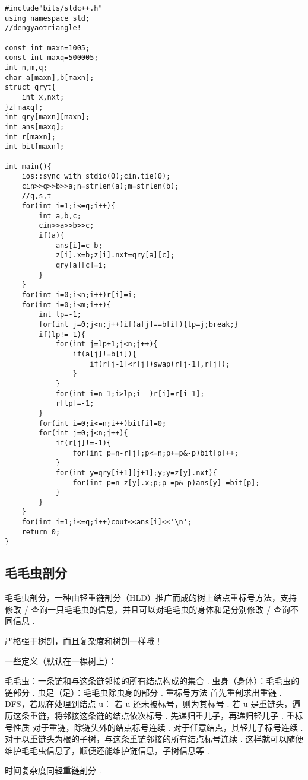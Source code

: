 \documentclass[12pt]{ctexart}
\begin{document}
\begin{lstlisting}
#include"bits/stdc++.h"
using namespace std;
//dengyaotriangle!

const int maxn=1005;
const int maxq=500005;
int n,m,q;
char a[maxn],b[maxn];
struct qryt{
    int x,nxt;
}z[maxq];
int qry[maxn][maxn];
int ans[maxq];
int r[maxn];
int bit[maxn];

int main(){
    ios::sync_with_stdio(0);cin.tie(0);
    cin>>q>>b>>a;n=strlen(a);m=strlen(b);
	//q,s,t
    for(int i=1;i<=q;i++){
        int a,b,c;
        cin>>a>>b>>c;
        if(a){
            ans[i]=c-b;
            z[i].x=b;z[i].nxt=qry[a][c];
            qry[a][c]=i;
        }
    }    
    for(int i=0;i<n;i++)r[i]=i;
    for(int i=0;i<m;i++){
        int lp=-1;
        for(int j=0;j<n;j++)if(a[j]==b[i]){lp=j;break;}
        if(lp!=-1){
            for(int j=lp+1;j<n;j++){
                if(a[j]!=b[i]){
                    if(r[j-1]<r[j])swap(r[j-1],r[j]);
                }
            }
            for(int i=n-1;i>lp;i--)r[i]=r[i-1];
            r[lp]=-1;
        }
        for(int i=0;i<=n;i++)bit[i]=0;
        for(int j=0;j<n;j++){
            if(r[j]!=-1){
                for(int p=n-r[j];p<=n;p+=p&-p)bit[p]++;
            }
            for(int y=qry[i+1][j+1];y;y=z[y].nxt){
                for(int p=n-z[y].x;p;p-=p&-p)ans[y]-=bit[p];
            }
        }
    }
    for(int i=1;i<=q;i++)cout<<ans[i]<<'\n';
    return 0;
}
\end{lstlisting}

\subsection{毛毛虫剖分}
毛毛虫剖分，一种由轻重链剖分（HLD）推广而成的树上结点重标号方法，支持修改 / 查询一只毛毛虫的信息，并且可以对毛毛虫的身体和足分别修改 / 查询不同信息 .

严格强于树剖，而且复杂度和树剖一样哦！

一些定义（默认在一棵树上）：

毛毛虫：一条链和与这条链邻接的所有结点构成的集合 .
虫身（身体）：毛毛虫的链部分 .
虫足（足）：毛毛虫除虫身的部分 .
重标号方法
首先重剖求出重链 .
DFS，若现在处理到结点 u：
若 u 还未被标号，则为其标号 .
若 u 是重链头，遍历这条重链，将邻接这条链的结点依次标号 .
先递归重儿子，再递归轻儿子 .
重标号性质
对于重链，除链头外的结点标号连续 .
对于任意结点，其轻儿子标号连续 .
对于以重链头为根的子树，与这条重链邻接的所有结点标号连续 .
这样就可以随便维护毛毛虫信息了，顺便还能维护链信息，子树信息等 .

时间复杂度同轻重链剖分 .
\end{document}
